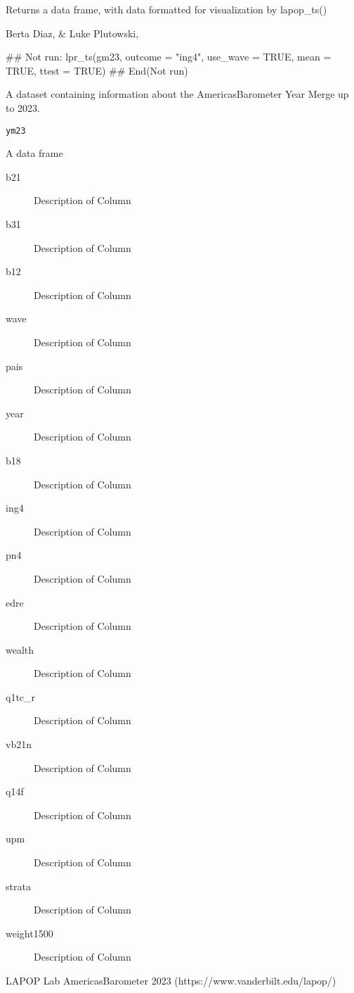 \documentclass[a4paper]{book}
\begin{document}
%
\begin{Value}
Returns a data frame, with data formatted for visualization by lapop\_ts()
\end{Value}
%
\begin{Author}
Berta Diaz,  \&
Luke Plutowski, 
\end{Author}
%
\begin{Examples}
\begin{ExampleCode}
## Not run: 
lpr_ts(gm23,
outcome = "ing4",
use_wave = TRUE,
mean = TRUE,
ttest = TRUE)
## End(Not run)
\end{ExampleCode}
\end{Examples}
%
\begin{Description}
A dataset containing information about the AmericasBarometer Year Merge up to 2023.
\end{Description}
%
\begin{Usage}
\begin{verbatim}
ym23
\end{verbatim}
\end{Usage}
%
\begin{Format}
A data frame
\begin{description}

\item[b21] Description of Column
\item[b31] Description of Column
\item[b12] Description of Column
\item[wave] Description of Column
\item[pais] Description of Column
\item[year] Description of Column
\item[b18] Description of Column
\item[ing4] Description of Column
\item[pn4] Description of Column
\item[edre] Description of Column
\item[wealth] Description of Column
\item[q1tc\_r] Description of Column
\item[vb21n] Description of Column
\item[q14f] Description of Column
\item[upm] Description of Column
\item[strata] Description of Column
\item[weight1500] Description of Column

\end{description}

\end{Format}
%
\begin{Source}
LAPOP Lab AmericasBarometer 2023 (https://www.vanderbilt.edu/lapop/)
\end{Source}
\printindex{}
\end{document}

